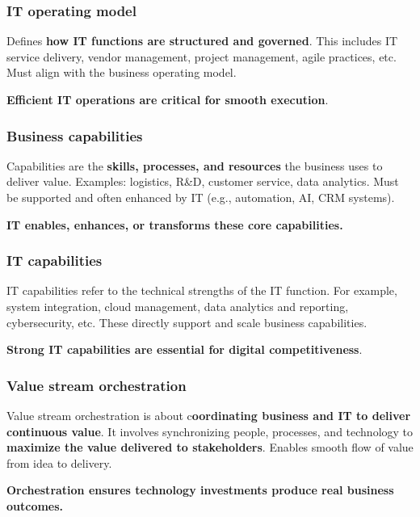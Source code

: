 \subsubsection{IT operating model}

\indent

Defines \textbf{how IT functions are structured and governed}. This includes IT service delivery, vendor management, project management, agile practices, etc. Must align with the business operating model.

\textbf{Efficient IT operations are critical for smooth execution}.

\subsubsection{Business capabilities}

\indent

Capabilities are the \textbf{skills, processes, and resources} the business uses to deliver value. Examples: logistics, R\&D, customer service, data analytics. Must be supported and often enhanced by IT (e.g., automation, AI, CRM systems).

\textbf{IT enables, enhances, or transforms these core capabilities.}

\subsubsection{IT capabilities}

\indent

IT capabilities refer to the technical strengths of the IT function. For example, system integration, cloud management, data analytics and reporting, cybersecurity, etc. These directly support and scale business capabilities.

\textbf{Strong IT capabilities are essential for digital competitiveness}.

\subsubsection{Value stream orchestration}

\indent

Value stream orchestration is about c\textbf{oordinating business and IT to deliver continuous value}. It involves synchronizing people, processes, and technology to \textbf{maximize the value delivered to stakeholders}. Enables smooth flow of value from idea to delivery.

\textbf{Orchestration ensures technology investments produce real 
business outcomes.}


